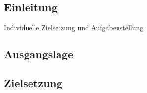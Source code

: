 \begin{inhalt}
\renewcommand*\chapterpagestyle{scrheadings}
\chapter{Einleitung}

Individuelle Zielsetzung und Aufgabenstellung

\section{Ausgangslage}
\section{Zielsetzung}


\end{inhalt}